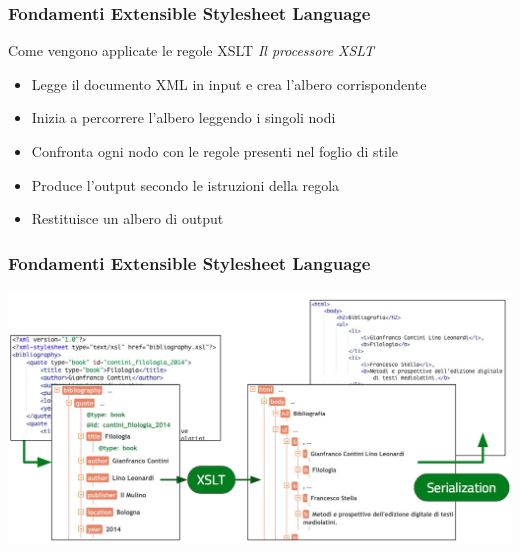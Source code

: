 \begin{frame}
    \frametitle{Fondamenti Extensible Stylesheet Language}
    \addtocounter{nframe}{1}
    

     \begin{block}{Come vengono applicate le regole XSLT}
        \emph{Il processore XSLT}
         \begin{itemize}
            \item Legge il documento XML in input e crea l’albero corrispondente
            \item Inizia a percorrere l’albero leggendo i singoli nodi
            \item Confronta ogni nodo con le regole presenti nel foglio di stile
            \item Produce l’output secondo le istruzioni della regola
            \item Restituisce un albero di output
        \end{itemize}
     \end{block}
    
\end{frame}

\begin{frame}
    \frametitle{Fondamenti Extensible Stylesheet Language}
    \addtocounter{nframe}{1}
    
    \begin{center}
        \includegraphics[width=.95\textwidth]{imgs/Processo-xslt.png}
    \end{center}

\end{frame}


